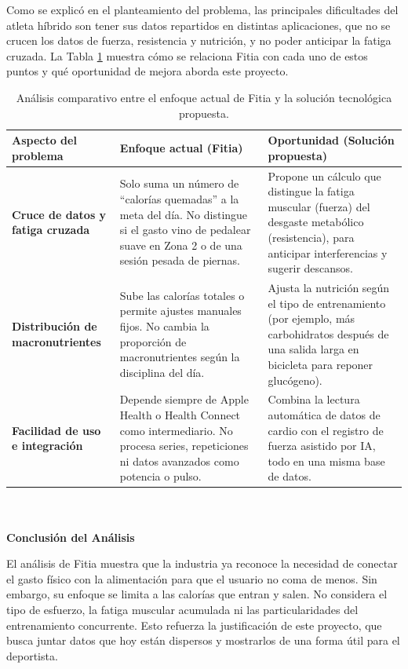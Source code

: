 Como se explicó en el planteamiento del problema, las principales dificultades del atleta híbrido son tener sus datos repartidos en distintas aplicaciones, que no se crucen los datos de fuerza, resistencia y nutrición, y no poder anticipar la fatiga cruzada. La Tabla \ref{tab:analisis_fitia} muestra cómo se relaciona Fitia con cada uno de estos puntos y qué oportunidad de mejora aborda este proyecto.
\begin{table}[h!]
    \centering
    \renewcommand{\arraystretch}{1.5}
    \begin{tabular}{|m{4cm}|m{5cm}|m{6cm}|}
        \hline
        \rowcolor[HTML]{EFEFEF}
        \textbf{Aspecto del problema} & \textbf{Enfoque actual (Fitia)} & \textbf{Oportunidad (Solución propuesta)} \\ \hline
        \textbf{Cruce de datos y fatiga cruzada} & Solo suma un número de ``calorías quemadas'' a la meta del día. No distingue si el gasto vino de pedalear suave en Zona 2 o de una sesión pesada de piernas. & Propone un cálculo que distingue la fatiga muscular (fuerza) del desgaste metabólico (resistencia), para anticipar interferencias y sugerir descansos. \\ \hline
        \textbf{Distribución de macronutrientes} & Sube las calorías totales o permite ajustes manuales fijos. No cambia la proporción de macronutrientes según la disciplina del día. & Ajusta la nutrición según el tipo de entrenamiento (por ejemplo, más carbohidratos después de una salida larga en bicicleta para reponer glucógeno). \\ \hline
        \textbf{Facilidad de uso e integración} & Depende siempre de Apple Health o Health Connect como intermediario. No procesa series, repeticiones ni datos avanzados como potencia o pulso. & Combina la lectura automática de datos de cardio con el registro de fuerza asistido por IA, todo en una misma base de datos. \\ \hline
    \end{tabular}
    \caption{Análisis comparativo entre el enfoque actual de Fitia y la solución tecnológica propuesta.}
    \label{tab:analisis_fitia}
\end{table}
\\\\
\textbf{Conclusión del Análisis}

El análisis de Fitia muestra que la industria ya reconoce la necesidad de conectar el gasto físico con la alimentación para que el usuario no coma de menos. Sin embargo, su enfoque se limita a las calorías que entran y salen. No considera el tipo de esfuerzo, la fatiga muscular acumulada ni las particularidades del entrenamiento concurrente. Esto refuerza la justificación de este proyecto, que busca juntar datos que hoy están dispersos y mostrarlos de una forma útil para el deportista.
\newpage
